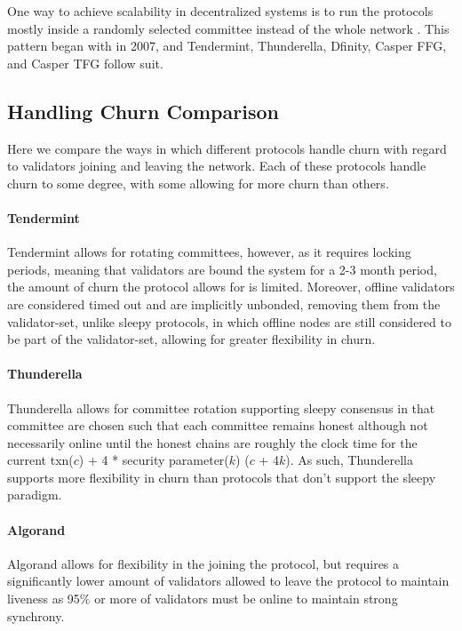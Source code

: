 \documentclass[10pt,journal,compsoc]{IEEEtran}
\begin{document}
One way to achieve scalability in decentralized systems is to run the protocols mostly inside a randomly selected committee instead of the whole network \cite{KapronEtAl}. This pattern began with \cite{KingEtAl} in 2007, and Tendermint, Thunderella, Dfinity, Casper FFG, and Casper TFG follow suit.

\subsection{Handling Churn Comparison}
Here we compare the ways in which different protocols handle churn with regard to validators joining and leaving the network. Each of these protocols handle churn to some degree, with some allowing for more churn than others. 

\paragraph{Tendermint} Tendermint allows for rotating committees, however, as it requires locking periods, meaning that validators are bound the system for a 2-3 month period, the amount of churn the protocol allows for is limited. Moreover, offline validators are considered timed out and are implicitly unbonded, removing them from the validator-set, unlike sleepy protocols, in which offline nodes are still considered to be part of the validator-set, allowing for greater flexibility in churn. \cite{Sleepy}

\paragraph{Thunderella} Thunderella allows for committee rotation supporting sleepy consensus in that committee are chosen such that each committee remains honest although not necessarily online until the honest chains are roughly the clock time for the current txn($c$) + 4 * security parameter($k$) ($c$ + 4$k$). As such, Thunderella supports more flexibility in churn than protocols that don't support the sleepy paradigm. 
  
\paragraph{Algorand} Algorand allows for flexibility in the joining the protocol, but requires a significantly lower amount of validators allowed to leave the protocol to maintain liveness as 95\% or more of validators must be online to maintain strong synchrony.
\end{document}
